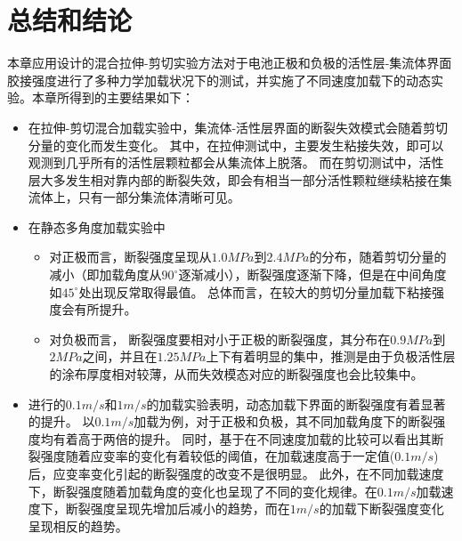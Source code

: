 \section{总结和结论}
本章应用设计的混合拉伸-剪切实验方法对于电池正极和负极的活性层-集流体界面胶接强度进行了多种力学加载状况下的测试，并实施了不同速度加载下的动态实验。本章所得到的主要结果如下：
\begin{itemize}
	\item 在拉伸-剪切混合加载实验中，集流体-活性层界面的断裂失效模式会随着剪切分量的变化而发生变化。 其中，在拉伸测试中，主要发生粘接失效，即可以观测到几乎所有的活性层颗粒都会从集流体上脱落。 而在剪切测试中，活性层大多发生相对靠内部的断裂失效，即会有相当一部分活性颗粒继续粘接在集流体上，只有一部分集流体清晰可见。
	\item 在静态多角度加载实验中
	\begin{itemize}
		\item 对正极而言，断裂强度呈现从$1.0MPa$到$2.4MPa$的分布，随着剪切分量的减小（即加载角度从$90^{\circ}$逐渐减小），断裂强度逐渐下降，但是在中间角度如$45^{\circ}$处出现反常取得最值。 总体而言，在较大的剪切分量加载下粘接强度会有所提升。
		\item 对负极而言， 断裂强度要相对小于正极的断裂强度，其分布在$0.9MPa$到$2MPa$之间，并且在$1.25MPa$上下有着明显的集中，推测是由于负极活性层的涂布厚度相对较薄，从而失效模态对应的断裂强度也会比较集中。
	\end{itemize}
	\item 进行的$0.1m/s$和$1m/s$的加载实验表明，动态加载下界面的断裂强度有着显著的提升。 以$0.1m/s$加载为例，对于正极和负极，其不同加载角度下的断裂强度均有着高于两倍的提升。 同时，基于在不同速度加载的比较可以看出其断裂强度随着应变率的变化有着较低的阈值，在加载速度高于一定值($0.1m/s$)后，应变率变化引起的断裂强度的改变不是很明显。 此外，在不同加载速度下，断裂强度随着加载角度的变化也呈现了不同的变化规律。在$0.1m/s$加载速度下，断裂强度呈现先增加后减小的趋势，而在$1m/s$的加载下断裂强度变化呈现相反的趋势。
\end{itemize}

